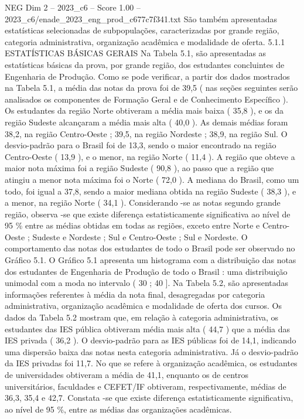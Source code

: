 \begin{textsample}{NEG Dim 2 – 2023\_c6 – Score 1.00 – 2023\_c6/enade\_2023\_eng\_prod\_c677c7f341.txt}
São também apresentadas estatísticas selecionadas de subpopulações, caracterizadas por grande região, categoria administrativa, organização acadêmica e modalidade de oferta. 5.1.1 ESTATÍSTICAS BÁSICAS GERAIS Na Tabela 5.1, são apresentadas as estatísticas básicas da prova, por grande região, dos estudantes concluintes de Engenharia de Produção.
Como se pode verificar, a partir dos dados mostrados na Tabela 5.1, a média das notas da prova foi de 39,5 ( nas seções seguintes serão analisados os componentes de Formação Geral e de Conhecimento Específico ).
Os estudantes da região Norte obtiveram a média mais baixa ( 35,8 ), e os da região Sudeste alcançaram a média mais alta ( 40,0 ).
As demais médias foram 38,2, na região Centro-Oeste ; 39,5, na região Nordeste ; 38,9, na região Sul.
O desvio-padrão para o Brasil foi de 13,3, sendo o maior encontrado na região Centro-Oeste ( 13,9 ), e o menor, na região Norte ( 11,4 ).
A região que obteve a maior nota máxima foi a região Sudeste ( 90,8 ), ao passo que a região que atingiu a menor nota máxima foi o Norte ( 72,0 ).
A mediana do Brasil, como um todo, foi igual a 37,8, sendo a maior mediana obtida na região Sudeste ( 38,3 ), e a menor, na região Norte ( 34,1 ).
Considerando -se as notas segundo grande região, observa -se que existe diferença estatisticamente significativa ao nível de 95 \% entre as médias obtidas em todas as regiões, exceto entre Norte e Centro-Oeste ; Sudeste e Nordeste ; Sul e Centro-Oeste ; Sul e Nordeste.
O comportamento das notas dos estudantes de todo o Brasil pode ser observado no Gráfico 5.1.
O Gráfico 5.1 apresenta um histograma com a distribuição das notas dos estudantes de Engenharia de Produção de todo o Brasil : uma distribuição unimodal com a moda no intervalo ( 30 ; 40 ].
Na Tabela 5.2, são apresentadas informações referentes à média da nota final, desagregadas por categoria administrativa, organização acadêmica e modalidade de oferta dos cursos.
Os dados da Tabela 5.2 mostram que, em relação à categoria administrativa, os estudantes das IES pública obtiveram média mais alta ( 44,7 ) que a média das IES privada ( 36,2 ).
O desvio-padrão para as IES públicas foi de 14,1, indicando uma dispersão baixa das notas nesta categoria administrativa.
Já o desvio-padrão da IES privadas foi 11,7.
No que se refere à organização acadêmica, os estudantes de universidades obtiveram a média de 41,1, enquanto os de centros universitários, faculdades e CEFET/IF obtiveram, respectivamente, médias de 36,3, 35,4 e 42,7.
Constata -se que existe diferença estatisticamente significativa, ao nível de 95 \%, entre as médias das organizações acadêmicas.

\end{textsample}
